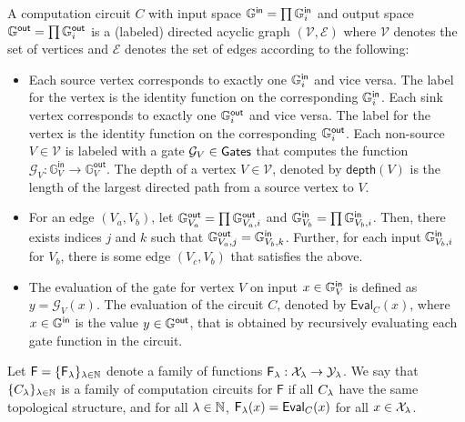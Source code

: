 \begin{definition}
A computation circuit $C$ with input space $\mathbb{G}^{\textsf{in}} = \prod \mathbb{G}^{\textsf{in}}_i$ and output space $\mathbb{G}^{\textsf{out}} = \prod \mathbb{G}^{\textsf{out}}_i$ is a (labeled) directed acyclic graph $(\mathcal{V},\mathcal{E})$ where $\mathcal{V}$ denotes the set of vertices and $\mathcal{E}$ denotes the set of edges according to the following:
\begin{itemize}

\item Each source vertex corresponds to exactly one $\mathbb{G}^{\textsf{in}}_i$ and vice versa. The label for the vertex is the identity function on the corresponding $\mathbb{G}^{\textsf{in}}_i$. Each sink vertex corresponds to exactly one $\mathbb{G}^{\textsf{out}}_i$ and vice versa. The label for the vertex is the identity function on the corresponding $\mathbb{G}^{\textsf{out}}_i$. Each non-source $V \in \mathcal{V}$ is labeled with a gate $\mathcal{G}_V \in \textnormal{\textsf{Gates}}$ that computes the function $\mathcal{G}_V: \mathbb{G}^{\textsf{in}}_V \to \mathbb{G}^{\textsf{out}}_V$. The depth of a vertex $V \in \mathcal{V}$, denoted by $\textsf{depth}(V)$ is the length of the largest directed path from a source vertex to $V$.


\item For an edge $(V_a, V_b)$, let $\mathbb{G}^{\textsf{out}}_{V_a} = \prod \mathbb{G}^{\textsf{out}}_{V_a,i}$ and $\mathbb{G}^{\textsf{in}}_{V_b} = \prod \mathbb{G}^{\textsf{in}}_{V_b, i}$. Then, there exists indices $j$ and $k$ such that $\mathbb{G}^{\textsf{out}}_{V_a,j} = \mathbb{G}^{\textsf{in}}_{V_b,k}$. Further, for each input $\mathbb{G}^{\textsf{in}}_{V_b,i}$ for $V_b$, there is some edge $(V_c, V_b)$ that satisfies the above.

\item The evaluation of the gate for vertex $V$ on input $x \in \mathbb{G}^{\textsf{in}}_V$ is defined as $y = \mathcal{G}_V(x)$. The evaluation of the circuit $C$, denoted by $\textsf{Eval}_C(x)$, where $x \in \mathbb{G}^{\textsf{in}}$ is the value $y \in \mathbb{G}^{\textsf{out}}$, that is obtained by recursively evaluating each gate function in the circuit.
\end{itemize}


Let $\mathsf{F} = \{\mathsf{F}_\lambda\}_{\lambda \in \mathbb{N}}$ denote a family of functions $\mathsf{F}_\lambda:\mathcal{X}_\lambda \to \mathcal{Y}_\lambda$. We say that $\{C_\lambda\}_{\lambda \in \mathbb{N}}$ is a family of computation circuits for $\mathsf{F}$ if all $C_\lambda$ have the same topological structure, and for all $\lambda \in \mathbb{N}$, $\mathsf{F}_\lambda(x) = \textsf{Eval}_C(x)$ for all $x \in \mathcal{X}_\lambda$.
\label{def:computation_circuit}
\end{definition}
\fi

